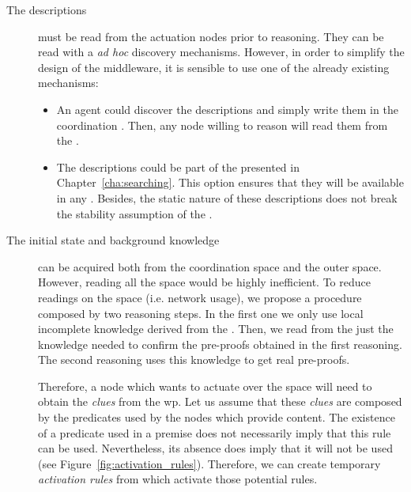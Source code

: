\begin{description}
  \item[The descriptions] must be read from the actuation nodes prior to reasoning. %
        They can be read with a \emph{ad hoc} discovery mechanisms.
        However, in order to simplify the design of the middleware, it is sensible to use one of the already existing mechanisms:
        
        \begin{itemize}
	  \item An agent could discover the descriptions and simply write them in the coordination \Space{}. %
		Then, any node willing to reason will read them from the \Space{}.
	  \item The descriptions could be part of the \clues{} presented in Chapter~\ref{cha:searching}.
		This option ensures that they will be available in any \consumer{}.
		Besides, the static nature of these descriptions does not break the stability assumption of the \clues{}. %
        \end{itemize}


  \item[The initial state and background knowledge] can be acquired both from the coordination space and the outer space.
	However, reading all the space would be highly inefficient.
	To reduce readings on the space (i.e. network usage), we propose a procedure composed by two reasoning steps.
	In the first one we only use local incomplete knowledge derived from the \clues{}.
	Then, we read from the \Space{} just the knowledge needed to confirm the pre-proofs obtained in the first reasoning.
	The second reasoning uses this knowledge to get real pre-proofs. %
	
	Therefore, a node which wants to actuate over the space will need to obtain the \emph{clues} from the \ac{wp}.
	Let us assume that these \emph{clues} are composed by the predicates used by the nodes which provide content. %
	The existence of a predicate used in a premise does not necessarily imply that this rule can be used.
	Nevertheless, its absence does imply that it will not be used (see Figure~\ref{fig:activation_rules}).
	Therefore, we can create temporary \emph{activation rules} from \clues{} which activate those potential rules. %


\end{description}

